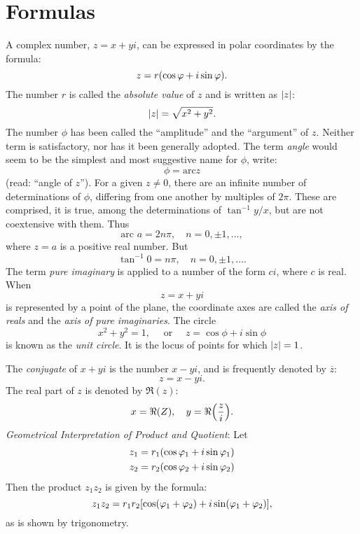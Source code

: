 \documentclass[letter,oneside]{memoir}
\begin{document}
\section{Formulas}

A complex number, $z=x+yi$, can be expressed in polar coordinates by the formula:
\[
	z=r\pbr*{\cos \phi +i\sin \phi } 
.\] The number $r$ is called the \emph{absolute value} of $z$ and is written as $\abs*{z} $:
\[
\abs*{z} =\sqrt{x^2+y^2} 
.\] The number $\phi $ has been called the ``amplitude'' and the ``argument'' of $z$. Neither term is satisfactory, nor has it been generally adopted. The term \emph{angle} would seem to be the simplest and most suggestive name for $\phi $, write:
\[
\phi =\text{arc} z
\] (read: ``angle of $z$''). For a given $z\neq 0$, there are an infinite number of determinations of $\phi $, differing from one another by multiples of $2\pi $. These are comprised, it is true, among the determinations of $\tan ^{-1}y /x$, but are not coextensive with them. Thus
\[
\text{arc } a=2n\pi , \quad n=0, \pm 1, \dots 
,\] where $z=a$ is a positive real number. But
\[
\tan ^{-1}0=n\pi , \quad n=0, \pm 1, \dots 
.\] The term \emph{pure imaginary} is applied to a number of the form $ci$, where $c$ is real. When
\[
z=x+yi
\] is represented by a point of the plane, the coordinate axes are called the \emph{axis of reals} and the \emph{axis of pure imaginaries}. The circle
\[
x^2+y^2=1, \quad \text{ or } \quad z=\cos \phi +i\sin \phi 
\] is known as the \emph{unit circle}. It is the locus of points for which $\abs*{z} =1$. 

The \emph{conjugate} of $x+yi$ is the number $x-yi$, and is frequently denoted by $\overline{z}$:
\[
z=x-yi
.\] The real part of $z$ is denoted by $\Re (z)$:
\[
	x=\Re (Z), \quad y=\Re \pbr*{\frac{z}{i}} 
.\] \emph{Geometrical Interpretation of Product and Quotient}: Let
\begin{align*}
	z_1&=r_1\pbr*{\cos \phi_1+i\sin \phi_1} \\
	z_2&=r_2\pbr*{\cos \phi_2+i\sin\phi_2} 
\end{align*} Then the product $z_1z_2$ is given by the formula:
\[
	z_1z_2=r_1r_2\sbr*{\cos \pbr*{\phi_1+\phi_2}+i\sin \pbr*{\phi_1+\phi_2}  } 
,\] as is shown by trigonometry.

\begin{wrapfigure}{r}{0.2\textwidth}
	\centering
{}
\end{wrapfigure}
\end{document}

